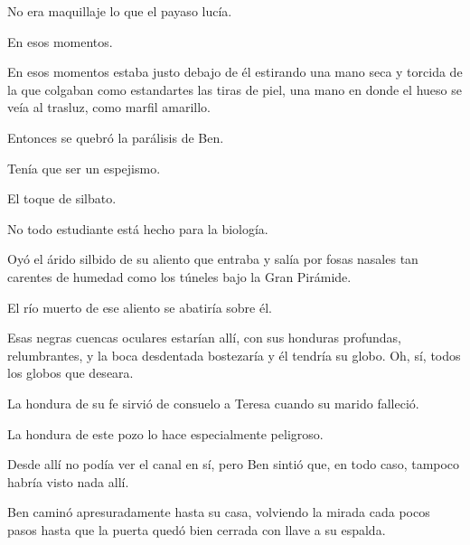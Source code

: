 \sk
No era maquillaje lo que el payaso lucía.

\sk
En esos momentos.

\sk
En esos momentos
estaba justo debajo de él estirando una mano seca
y torcida de la que colgaban como estandartes las
tiras de piel, una mano en donde el hueso se veía
al trasluz, como marfil amarillo.

\sk
Entonces se quebró la parálisis de Ben.

\sk
Tenía que ser un espejismo.

\sk
El toque de silbato.

\sk
No todo estudiante está hecho para la biología.

\sk
Oyó el árido silbido de su aliento que entraba y
salía por fosas nasales tan carentes de humedad
como los túneles bajo la Gran Pirámide.

\sk
El río muerto de ese aliento se abatiría sobre él.

\sk
Esas negras cuencas oculares
estarían allí, con sus honduras profundas,
relumbrantes, y la boca desdentada bostezaría y él
tendría su globo. Oh, sí, todos los globos que
deseara.

\sk
La hondura de su fe sirvió de consuelo a Teresa cuando su marido falleció.

\sk
La hondura de este pozo lo hace especialmente peligroso.

\sk
Desde allí no podía ver el
canal en sí, pero Ben sintió que, en todo caso,
tampoco habría visto nada allí.

\sk
Ben caminó apresuradamente hasta su casa,
volviendo la mirada cada pocos pasos hasta que la
puerta quedó bien cerrada con llave a su espalda.

